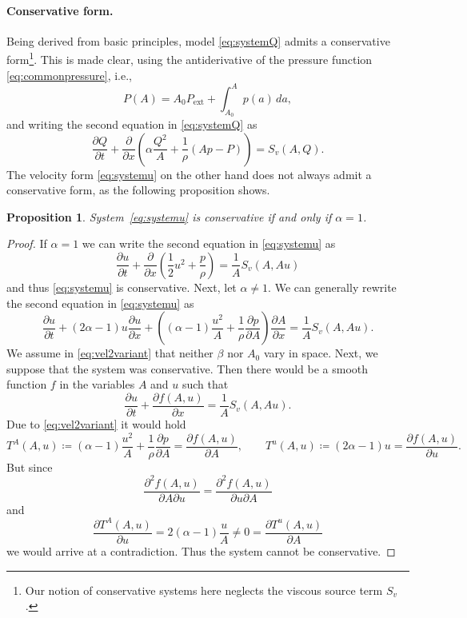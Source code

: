 \documentclass[a4paper,11pt]{article}
\newtheorem{proposition}[theorem]{Proposition}
\begin{document}
\paragraph{Conservative form.} Being derived from basic principles, model \eqref{eq:systemQ} admits a conservative form\footnote{Our notion of conservative systems here neglects the viscous source term $S_v$.}. This is made clear, using the antiderivative of the pressure function \eqref{eq:commonpressure}, i.e.,
\begin{equation*}
  P(A) = A_0 P_\text{ext} + \int_{A_0}^A p(a) \, da,
\end{equation*}
and writing the second equation in \eqref{eq:systemQ} as
\begin{equation}\label{eq:flow2conservative}
  \frac{\partial Q}{\partial t} + \frac{\partial}{\partial x} \left( \alpha \frac{Q^2}{A} + \frac{1}{\rho} (Ap - P)\right) = S_v(A, Q).
\end{equation}
The velocity form \eqref{eq:systemu} on the other hand does not always admit a conservative form, as the following proposition shows.
\begin{proposition}
  System~\eqref{eq:systemu} is conservative if and only if $\alpha=1$.
\end{proposition}
\begin{proof}
  If $\alpha=1$ we can write the second equation in \eqref{eq:systemu} as
  \begin{equation*}
    \frac{\partial u}{\partial t} + \frac{\partial}{\partial x} \left( \frac 12 u^2 +  \frac{p}{\rho} \right) =\frac{1}{A} S_v(A, Au)
  \end{equation*}
  and thus \eqref{eq:systemu} is conservative. Next, let $\alpha \ne 1$. We can generally rewrite  the second equation in \eqref{eq:systemu} as 
  \begin{equation}\label{eq:vel2variant}
    \frac{\partial u}{\partial t} + (2\alpha - 1)u \frac{\partial u}{\partial x} + \left( (\alpha -1) \frac{u^2}{A} + \frac{1}{\rho} \frac{\partial p}{\partial A} \right) \frac{\partial A}{\partial x}  =\frac{1}{A} S_v(A, Au).
  \end{equation}
  We assume in \eqref{eq:vel2variant} that neither $\beta$ nor $A_0$ vary in space. Next, we suppose that the system was conservative. Then there would be a smooth function $f$ in the variables $A$ and $u$ such that
  \begin{equation*}
    \frac{\partial u}{\partial t} + \frac{\partial f(A,u)}{\partial x} = \frac{1}{A} S_v(A, Au).
  \end{equation*}
  Due to \eqref{eq:vel2variant} it would hold
  \[
    T^A(A,u) \coloneqq (\alpha -1) \frac{u^2}{A} + \frac{1}{\rho} \frac{\partial p}{\partial A} = \frac{\partial f(A,u)}{\partial A}, \qquad T^u(A,u) \coloneqq (2\alpha - 1)u = \frac{\partial f(A,u)}{\partial u}.
  \]
      But since
      \[
        \frac{\partial^2 f(A,u)}{\partial A \partial u} =  \frac{\partial^2 f(A,u)}{\partial u \partial A}
      \]
      and
      \[
        \frac{\partial  T^A(A,u)}{\partial u} = 2 (\alpha -1) \frac{u}{A} \ne 0 = \frac{\partial T^u(A,u)}{\partial A}
      \]
      we would arrive at a contradiction. Thus the system cannot be conservative. 
    \end{proof}
\end{document}
